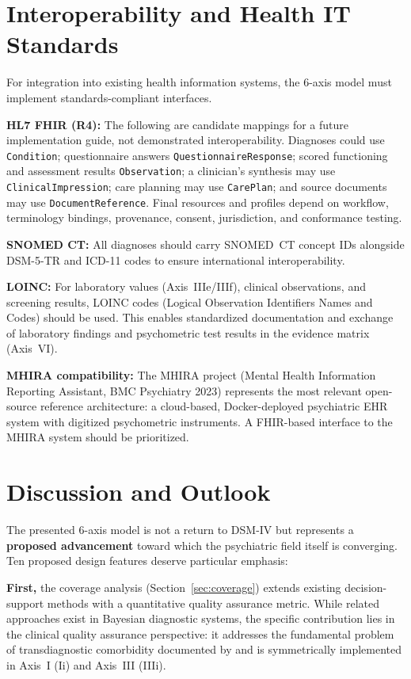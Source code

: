\documentclass[11pt,a4paper]{article}
\begin{document}
\section{Interoperability and Health IT Standards}
\label{sec:interop}

For integration into existing health information systems, the 6-axis model must implement standards-compliant interfaces.

\textbf{HL7 FHIR (R4):} The following are candidate mappings for a future implementation guide, not demonstrated interoperability. Diagnoses could use \nolinkurl{Condition}; questionnaire answers \nolinkurl{QuestionnaireResponse}; scored functioning and assessment results \nolinkurl{Observation}; a clinician's synthesis may use \nolinkurl{ClinicalImpression}; care planning may use \nolinkurl{CarePlan}; and source documents may use \nolinkurl{DocumentReference}. Final resources and profiles depend on workflow, terminology bindings, provenance, consent, jurisdiction, and conformance testing.

\textbf{SNOMED CT:} All diagnoses should carry SNOMED~CT concept IDs alongside DSM-5-TR and ICD-11 codes to ensure international interoperability.

\textbf{LOINC:} For laboratory values (Axis~IIIe/IIIf), clinical observations, and screening results, LOINC codes (Logical Observation Identifiers Names and Codes) should be used. This enables standardized documentation and exchange of laboratory findings and psychometric test results in the evidence matrix (Axis~VI).

\textbf{MHIRA compatibility:} The MHIRA project (Mental Health Information Reporting Assistant, BMC Psychiatry 2023) represents the most relevant open-source reference architecture: a cloud-based, Docker-deployed psychiatric EHR system with digitized psychometric instruments. A FHIR-based interface to the MHIRA system should be prioritized.

\section{Discussion and Outlook}
\label{sec:discussion}

The presented 6-axis model is not a return to DSM-IV but represents a \textbf{proposed advancement} toward which the psychiatric field itself is converging. Ten proposed design features deserve particular emphasis:

\textbf{First,} the coverage analysis (Section~\ref{sec:coverage}) extends existing decision-support methods with a quantitative quality assurance metric. While related approaches exist in Bayesian diagnostic systems, the specific contribution lies in the clinical quality assurance perspective: it addresses the fundamental problem of transdiagnostic comorbidity documented by \citet{PlanaRipoll2019} and is symmetrically implemented in Axis~I (Ii) and Axis~III (IIIi).
\end{document}
